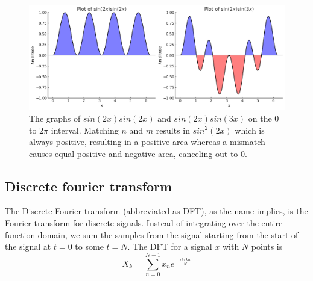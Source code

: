 \begin{figure}[ht]
    \centering
    \includegraphics[width=\textwidth]{./images/transformIdea.png}
    \caption{The graphs of $sin(2x)sin(2x)$ and $sin(2x)sin(3x)$ on the $0$ to $2\pi$ interval. Matching $n$ and $m$ results in $sin^2(2x)$ which is always positive, resulting in a positive area whereas a mismatch causes equal positive and negative area, canceling out to 0.\label{fig:transformIdea}}
\end{figure}

\subsection{Discrete fourier transform} 
The Discrete Fourier transform (abbreviated as DFT), as the name implies, is the Fourier transform for discrete signals. Instead of integrating over the entire function domain, we sum the samples from the signal starting from the start of the signal at $t=0$ to some $t=N$. The DFT for a signal $x$ with $N$ points is 
$$X_k = \sum_{n=0}^{N-1} x_ne^{-\frac{i2\pi kn}{N}}$$

